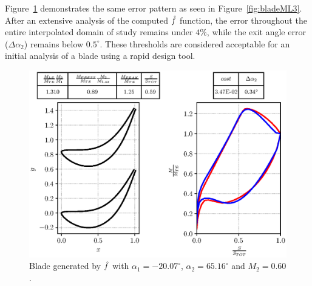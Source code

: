 
Figure~\ref{fig:bladeML4} demonstrates the same error pattern as seen in Figure~\ref{fig:bladeML3}. 
After an extensive analysis of the computed $\hat{\mathnormal{f}}$ function, the error throughout the entire interpolated domain of study 
remains under $4\%$, while the exit angle error ($\Delta \alpha_2$) remains below $0.5^{\circ}$. These thresholds are considered 
acceptable for an initial analysis of a blade using a rapid design tool.

\begin{figure}[H]
    \centering 
    \includegraphics[scale=\scaleBlade]{./images/blade--2007-6516-60.eps}
    \caption{Blade generated by $\hat{\mathnormal{f}}$ with $\alpha_1 = -20.07^{\circ}$, $\alpha_2 = 65.16^{\circ}$ and $M_2 = 0.60$.}
    \label{fig:bladeML4}
\end{figure}
 